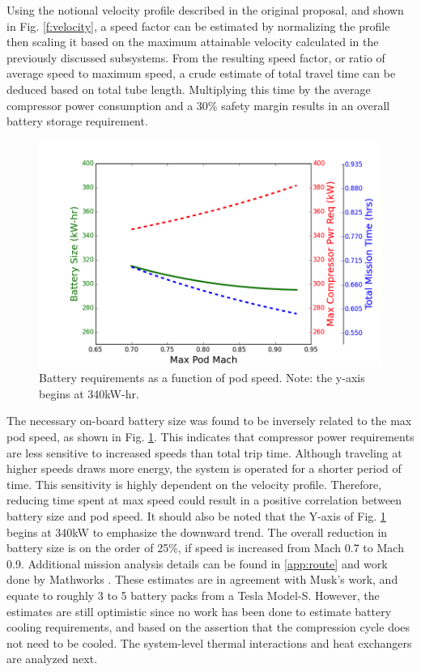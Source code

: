 \documentclass[heading.tex]{subfiles}
\begin{document}
Using the notional velocity profile described in the original proposal, and shown in Fig. \ref{f:velocity},
a speed factor can be estimated by normalizing the profile then scaling it based on the maximum
attainable velocity calculated in the previously discussed subsystems.
From the resulting speed factor, or ratio of average speed to maximum speed,
a crude estimate of total travel time can be deduced based on total tube length.
Multiplying this time by the average compressor power consumption and a 30\% safety margin results in an overall battery storage requirement.

\begin{figure}[hbtp]
\centering
\includegraphics[width=\textwidth]{images/battery_plot.png}
\caption[Battery requirements as a function of pod speed]{Battery requirements as a function of pod speed. Note: the y-axis begins at 340kW-hr.}
\label{f:battery}
\end{figure}

The necessary on-board battery size was found to be inversely related to the max pod speed, as shown in Fig. \ref{f:battery}.
This indicates that compressor power requirements are less sensitive to increased speeds than total trip time.
Although traveling at higher speeds draws more energy, the system is operated for a shorter period of time.
This sensitivity is highly dependent on the velocity profile.
Therefore, reducing time spent at max speed could result in a positive correlation between battery size and pod speed.
It should also be noted that the Y-axis of Fig. \ref{f:battery} begins at 340kW to emphasize the downward trend.
The overall reduction in battery size is on the order of 25\%, if speed is increased from Mach 0.7 to Mach 0.9.
Additional mission analysis details can be found in \cref{app:route} and work done by Mathworks \cite{Rouleau}.
These estimates are in agreement with Musk’s work, and equate to roughly 3 to 5 battery packs from a Tesla Model-S.
However, the estimates are still optimistic since no work has been done to estimate battery cooling requirements,
and based on the assertion that the compression cycle does not need to be cooled.
The system-level thermal interactions and heat exchangers are analyzed next.
\end{document}
